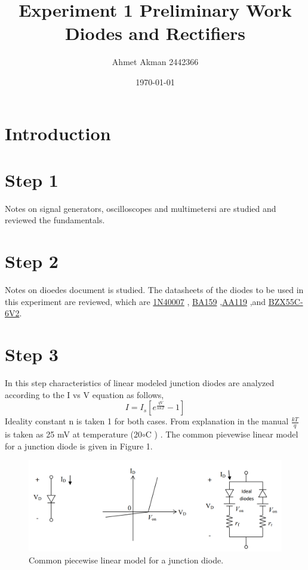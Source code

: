 \documentclass[letterpaper,12pt]{article}
\begin{document}
\title{Experiment 1 Preliminary Work \protect\\ Diodes and Rectifiers}
\author{Ahmet Akman 2442366 \protect\\}
\date{\today}
\maketitle


\section{Introduction} 
\section{Step 1}
Notes on signal generators, oscilloscopes and multimetersi are studied and reviewed the fundamentals.
\section{Step 2}
Notes on dioedes document is studied. The datasheets of the diodes to be used in this experiment are reviewed, which are \href{https://www.vishay.com/docs/88503/1n4001.pdf}{1N40007} , \href{https://www.vishay.com/docs/88536/ba157.pdf}{BA159} ,\href{https://logosfoundation.org/elektron/mixers/AA119.pdf}{AA119} ,and \href{https://www.vishay.com/docs/85604/bzx55.pdf}{BZX55C-6V2}.   
\section{Step 3}
In this step characteristics of linear modeled junction diodes are analyzed according to the I vs V equation as follows,
\[
I  = I_s[e^\frac{qV}{nkT} - 1]    
\] 
Ideality constant n is taken 1 for both cases. From explanation in the manual \(\frac{kT}{q}\) is taken as 25 mV at temperature (20\(\circ\)C ) . The common pievewise linear model for a junction diode is given in Figure 1.
\begin{figure}[H]
    \centering
   \includegraphics[width=1\textwidth]{3_1.png}
   \caption{Common piecewise linear model for a junction diode.}
\end{figure} 
\end{document}
